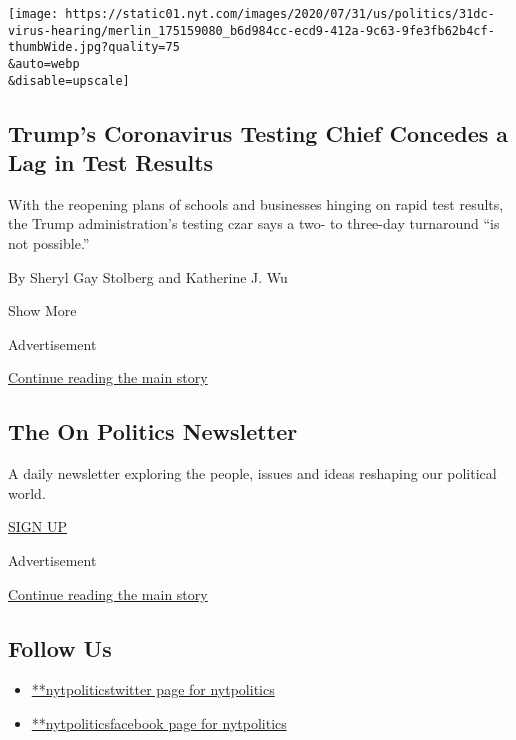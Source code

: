 \begin{enumerate}
  \texttt{[image: https://static01.nyt.com/images/2020/07/31/us/politics/31dc-virus-hearing/merlin\_175159080\_b6d984cc-ecd9-412a-9c63-9fe3fb62b4cf-thumbWide.jpg?quality=75\\\&auto=webp\\\&disable=upscale]}

  \hypertarget{trumps-coronavirus-testing-chief-concedes-a-lag-in-test-results}{%
  \subsection{Trump's Coronavirus Testing Chief Concedes a Lag in Test
  Results}\label{trumps-coronavirus-testing-chief-concedes-a-lag-in-test-results}}

  With the reopening plans of schools and businesses hinging on rapid
  test results, the Trump administration's testing czar says a two- to
  three-day turnaround ``is not possible.''

  By Sheryl Gay Stolberg and Katherine J. Wu
\end{enumerate}

Show More

Advertisement

\protect\hyperlink{after-mid2}{Continue reading the main story}

\hypertarget{the-on-politics-newsletter}{%
\subsection{The On Politics
Newsletter}\label{the-on-politics-newsletter}}

A daily newsletter exploring the people, issues and ideas reshaping our
political world.

\href{/newsletters/signup/CN}{SIGN UP}

Advertisement

\protect\hyperlink{after-mktg}{Continue reading the main story}

\hypertarget{follow-us}{%
\subsection{Follow Us}\label{follow-us}}

\begin{itemize}
\tightlist
\item
  \href{https://twitter.com/nytpolitics}{**nytpoliticstwitter page for
  nytpolitics}
\item
  \href{https://www.facebook.com/nytpolitics}{**nytpoliticsfacebook page
  for nytpolitics}
\end{itemize}


